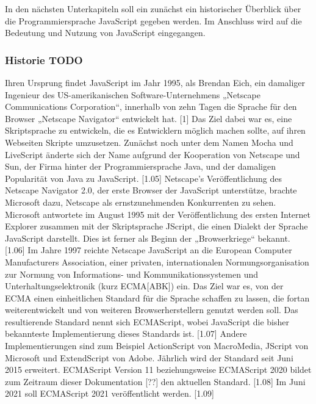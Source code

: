 In den nächsten Unterkapiteln soll ein zunächst ein historischer Überblick über die Programmiersprache JavaScript gegeben werden. Im Anschluss wird auf die Bedeutung und Nutzung von JavaScript eingegangen. 

\subsubsection{Historie TODO }
Ihren Ursprung findet JavaScript im Jahr 1995, als Brendan Eich, ein damaliger Ingenieur des US-amerikanischen Software-Unternehmens „Netscape Communications Corporation“, innerhalb von zehn Tagen die Sprache für den Browser „Netscape Navigator“ entwickelt hat. [1] Das Ziel dabei war es, eine Skriptsprache zu entwickeln, die es Entwicklern möglich machen sollte, auf ihren Webseiten Skripte umzusetzen. Zunächst noch unter dem Namen Mocha und LiveScript änderte sich der Name aufgrund der Kooperation von Netscape und Sun, der Firma hinter der Programmiersprache Java, und der damaligen Popularität von Java zu JavaScript. [1.05] 
Netscape’s Veröffentlichung des Netscape Navigator 2.0, der erste Browser der JavaScript unterstütze, brachte Microsoft dazu, Netscape als ernstzunehmenden Konkurrenten zu sehen. 
Microsoft antwortete im August 1995 mit der Veröffentlichung des ersten Internet Explorer zusammen mit der Skriptsprache JScript, die einen Dialekt der Sprache JavaScript darstellt. Dies ist ferner als Beginn der „Browserkriege“ bekannt. [1.06]
 Im Jahre 1997 reichte Netscape JavaScript an die European Computer Manufacturers Association, einer privaten, internationalen Normungsorganisation zur Normung von Informations- und Kommunikationssystemen und Unterhaltungselektronik (kurz ECMA[ABK]) ein. Das Ziel war es, von der ECMA einen einheitlichen Standard für die Sprache schaffen zu lassen, die fortan weiterentwickelt und von weiteren Browserherstellern genutzt werden soll. Das resultierende Standard nennt sich ECMAScript, wobei JavaScript die bisher bekannteste Implementierung dieses Standards ist. [1.07] Andere Implementierungen sind zum Beispiel ActionScript von MacroMedia, JScript von Microsoft und ExtendScript von Adobe.
Jährlich wird der Standard seit Juni 2015 erweitert. ECMAScript Version 11 beziehungsweise ECMAScript 2020 bildet zum Zeitraum dieser Dokumentation [??] den aktuellen Standard. [1.08] 
Im Juni 2021 soll ECMAScript 2021 veröffentlicht werden.  [1.09]

